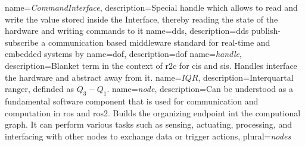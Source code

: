 \hyphenation{
}

\newcommand{\mybibliographyfiles}{Bibliography/ipr_articles,Bibliography/kit_template_example_bibliography,Bibliography/masterthesis}


{
    name={\textit{CommandInterface}},
    description={Special \gls{handle} which allows to read and write the value stored inside the Interface, thereby reading the state of the hardware and writing commands to it}
}
{
    name={\gls{dds}},
    description={\acrlong{dds} publish-subscribe a communication based middleware standard for real-time and embedded systems by \cite{pardo-castellote_omg_2003, schlesselman_omg_2004, noauthor_data_nodate}}
}
{
    name={\gls{dof}},
    description={\acrlong{dof}}
}
{
    name={\textit{handle}},
    description={Blanket term in the context of \gls{r2c} for \glspl{ci} and \glspl{si}. Handles interface the hardware and abstract away from it. }
}
{
    name={$IQR$},
    description={Interquartal ranger, definded as $Q_3-Q_1$.}
}
{
    name={\textit{node}},
    description={Can be understood as a fundamental software component that is used for communication and computation in \gls{ros} and \gls{ros2}. Builds the organizing endpoint int the computional graph. It can perform various tasks such as sensing, actuating, processing, and interfacing with other nodes to exchange data or trigger actions},
    plural={\textit{nodes}}
}
